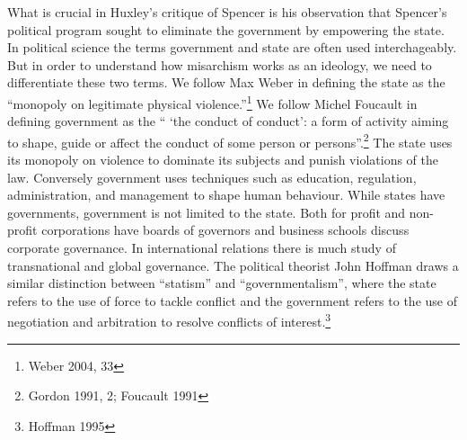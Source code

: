 \documentclass[12pt,]{article}
\begin{document}
What is crucial in Huxley's critique of Spencer is his observation that
Spencer's political program sought to eliminate the government by
empowering the state. In political science the terms government and
state are often used interchageably. But in order to understand how
misarchism works as an ideology, we need to differentiate these two
terms. We follow Max Weber in defining the state as the ``monopoly on
legitimate physical violence.''\footnote{Weber 2004, 33} We follow
Michel Foucault in defining government as the `` `the conduct of
conduct': a form of activity aiming to shape, guide or affect the
conduct of some person or persons''.\footnote{Gordon 1991, 2; Foucault
  1991} The state uses its monopoly on violence to dominate its subjects
and punish violations of the law. Conversely government uses techniques
such as education, regulation, administration, and management to shape
human behaviour. While states have governments, government is not
limited to the state. Both for profit and non-profit corporations have
boards of governors and business schools discuss corporate governance.
In international relations there is much study of transnational and
global governance. The political theorist John Hoffman draws a similar
distinction between ``statism'' and ``governmentalism'', where the state
refers to the use of force to tackle conflict and the government refers
to the use of negotiation and arbitration to resolve conflicts of
interest.\footnote{Hoffman 1995}
\end{document}

